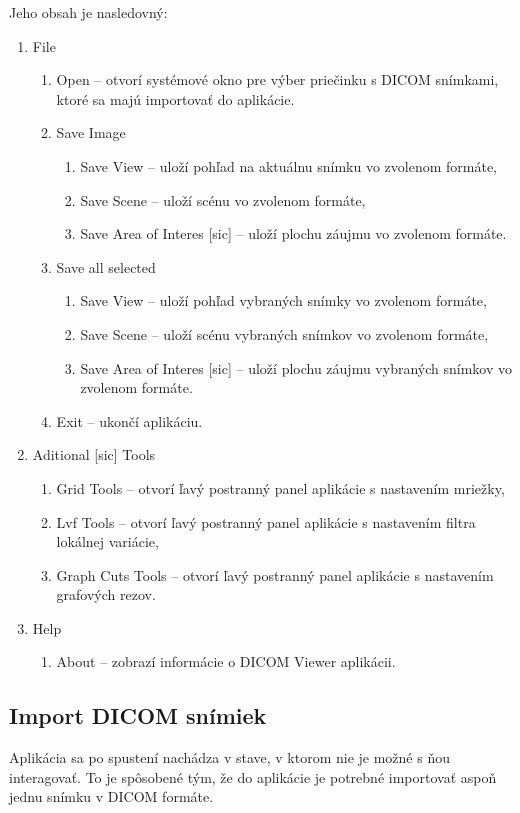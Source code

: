 {Jeho obsah je nasledovný:
\begin {enumerate}
\item {File}
	\begin {enumerate}
		\item {Open -- otvorí systémové okno pre výber priečinku s DICOM snímkami, ktoré sa majú importovať do aplikácie.}
		\item {Save Image}
		\begin {enumerate}
			\item {Save View -- uloží pohľad na aktuálnu snímku vo zvolenom formáte,}
			\item {Save Scene -- uloží scénu vo zvolenom formáte,}
			\item {Save Area of Interes [sic] -- uloží plochu záujmu vo zvolenom formáte.}
		\end {enumerate}
	\item {Save all selected}
		\begin {enumerate}
			\item {Save View -- uloží pohľad vybraných snímky vo zvolenom formáte,}
			\item {Save Scene -- uloží scénu vybraných snímkov vo zvolenom formáte,}
			\item {Save Area of Interes [sic] -- uloží plochu záujmu vybraných snímkov vo zvolenom formáte.}
		\end {enumerate}	
	\item {Exit -- ukončí aplikáciu.}
	\end {enumerate}
\item {Aditional [sic] Tools}
	\begin {enumerate}
	\item {Grid Tools -- otvorí ľavý postranný panel aplikácie s nastavením mriežky,}
	\item {Lvf Tools -- otvorí ľavý postranný panel aplikácie s nastavením filtra lokálnej variácie,}
	\item {Graph Cuts Tools -- otvorí ľavý postranný panel aplikácie s nastavením grafových rezov.}
	\end {enumerate}
\item {Help}
	\begin {enumerate}
	\item {About -- zobrazí informácie o DICOM Viewer aplikácii.}
	\end {enumerate}
\end {enumerate}

\clearpage
\subsection {Import DICOM snímiek}
Aplikácia sa po spustení nachádza v stave, v ktorom nie je možné s ňou interagovať. To je spôsobené tým, že do aplikácie je potrebné importovať aspoň jednu snímku v DICOM formáte.

}
